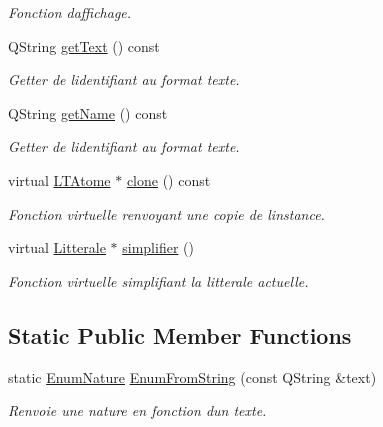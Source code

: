 \begin{DoxyCompactItemize}
\begin{DoxyCompactList}\small\item\em Fonction d\textquotesingle{}affichage. \end{DoxyCompactList}\item 
Q\+String \hyperlink{class_l_t_atome_a2140a7071f7d1d5ddca671802de17447}{get\+Text} () const 
\begin{DoxyCompactList}\small\item\em Getter de l\textquotesingle{}identifiant au format texte. \end{DoxyCompactList}\item 
Q\+String \hyperlink{class_l_t_atome_a814a35a047dc21cc912a06789919973d}{get\+Name} () const 
\begin{DoxyCompactList}\small\item\em Getter de l\textquotesingle{}identifiant au format texte. \end{DoxyCompactList}\item 
virtual \hyperlink{class_l_t_atome}{L\+T\+Atome} $\ast$ \hyperlink{class_l_t_atome_a8fd75a87781e2544fb090da6096a7106}{clone} () const 
\begin{DoxyCompactList}\small\item\em Fonction virtuelle renvoyant une copie de l\textquotesingle{}instance. \end{DoxyCompactList}\item 
virtual \hyperlink{class_litterale}{Litterale} $\ast$ \hyperlink{class_l_t_atome_a2e2cee64c687ab8c648e4866ab1150b8}{simplifier} ()
\begin{DoxyCompactList}\small\item\em Fonction virtuelle simplifiant la litterale actuelle. \end{DoxyCompactList}\end{DoxyCompactItemize}
\subsection*{Static Public Member Functions}
\begin{DoxyCompactItemize}
\item 
static \hyperlink{class_l_t_atome_a340480fc682a6d8fd819026d20278b49}{Enum\+Nature} \hyperlink{class_l_t_atome_aa684a663ff7ac9011903eb6bd43593af}{Enum\+From\+String} (const Q\+String \&text)
\begin{DoxyCompactList}\small\item\em Renvoie une nature en fonction d\textquotesingle{}un texte. \end{DoxyCompactList}\end{DoxyCompactItemize}


